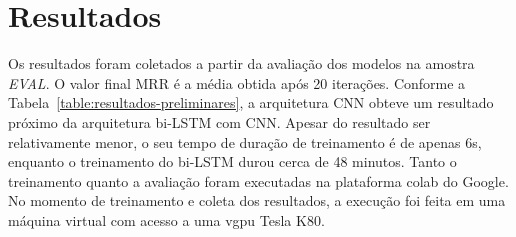 \section{Resultados}

Os resultados foram coletados a partir da avaliação dos modelos na amostra \emph{EVAL}. O valor final MRR é a média obtida após 20 iterações. Conforme a Tabela~\ref{table:resultados-preliminares},  a arquitetura CNN obteve um resultado próximo da arquitetura bi-LSTM com CNN. Apesar do resultado ser relativamente menor, o seu tempo de duração de treinamento é de apenas 6s, enquanto o treinamento do bi-LSTM durou cerca de 48 minutos. Tanto o treinamento quanto a avaliação foram executadas na plataforma \Gls{colab} do Google. No momento de treinamento e coleta dos resultados, a execução foi feita em uma máquina virtual com acesso a uma \acrshort{vgpu} Tesla K80.

